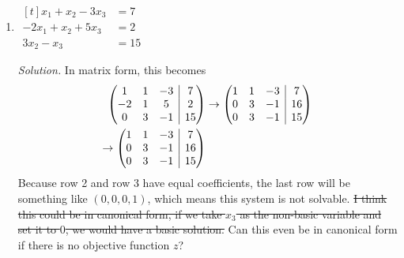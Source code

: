 \documentclass{homework}
\makeatletter
\newcommand{\solution}{	\vspace{1em} \textit{Solution.} \quad }
\newenvironment{amatrix}[1]{%
	\left(\begin{array}{@{}*{#1}{c}|c@{}}
	}{%
	\end{array}\right)
}
\makeatother
\begin{document}
\begin{enumerate}
\begin{enumerate}
				$x_1 + 2x_2 = 4$
				
				\solution	Putting this into matrix form, it's clear that because the coefficients of $x_1$ and $x_2$ are equal, there is no pivot operation to separate out a single variable,
				\begin{align*}
					\begin{amatrix}{2}
						1 & 2 & 3 \\
						1 & 2 & 4
					\end{amatrix}.
				\end{align*}
				Because the coefficients are equal, the last row will be something like $(0, 0, -1)$, so this system is not solvable. \sout{This system is also not in canonical form, as if we take either $x_1$ or $x_2$ as the basic variable, there is no feasible solution.} I'm not sure, since a canonical form requires an objective function.
				
				
			\item $\begin{aligned}[t]
				x_1 + x_2  -  3x_3  & = 7 \\
				 -2x_1  + x_2  +  5x_3 & = 2 \\
				 3x_2 - x_3 & = 15
			\end{aligned}$
		
			
			\solution In matrix form, this becomes \begin{align*}
				\begin{amatrix}{3}
					1 & 1 & -3 & 7 \\
					-2 & 1 & 5 & 2 \\
					0 & 3 & -1 & 15
				\end{amatrix} & \to \begin{amatrix}{3}
				1 & 1 & -3 & 7 \\
				0 & 3 & -1 & 16 \\
				0 & 3 & -1 & 15
			\end{amatrix} \\
			\to \begin{amatrix}{3}
				1 & 1 & -3 & 7 \\
				0 & 3 & -1 & 16 \\
				0 & 3 & -1 & 15
			\end{amatrix}
			\end{align*}
			Because row 2 and row 3 have equal coefficients, the last row will be something like $(0, 0, 0, 1)$, which means this system is not solvable. \sout{I think this could be in canonical form, if we take $x_3$ as the non-basic variable and set it to $0$, we would have a basic solution.} Can this even be in canonical form if there is no objective function $z$?
		\end{enumerate}
		
	\end{enumerate}
\end{document}
